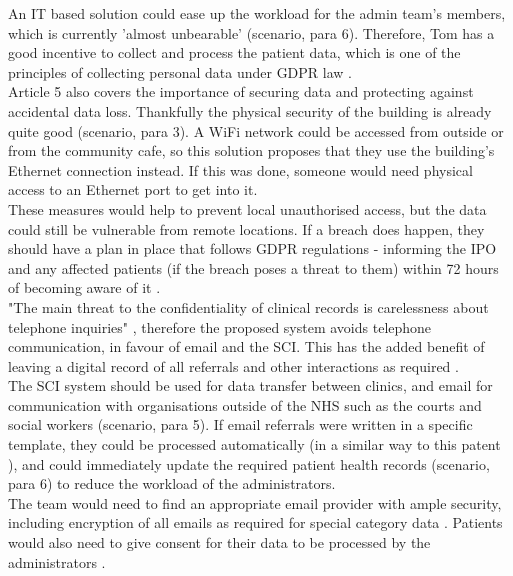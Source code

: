 \documentclass[12pt,a4paper]{article}
\begin{document}
An IT based solution could ease up the workload for the admin team's members, which is currently 'almost unbearable' (scenario, para 6). Therefore, Tom has a good incentive to collect and process the patient data, which is one of the principles of collecting personal data under GDPR law \cite{Article5}.\\ 

Article 5 also covers the importance of securing data and protecting against accidental data loss. Thankfully the physical security of the building is already quite good (scenario, para 3). A WiFi network could be accessed from outside or from the community cafe, so this solution proposes that they use the building's Ethernet connection instead. If this was done, someone would need physical access to an Ethernet port to get into it.\\

These measures would help to prevent local unauthorised access, but the data could still be vulnerable from remote locations. If a breach does happen, they should have a plan in place that follows GDPR regulations - informing the IPO and any affected patients (if the breach poses a threat to them) within 72 hours of becoming aware of it \cite{Article33&34}.\\

"The main threat to the confidentiality of clinical records is carelessness about telephone inquiries" \cite{ClinicalSystemSecurity}, therefore the proposed system avoids telephone communication, in favour of email and the SCI. This has the added benefit of leaving a digital record of all referrals and other interactions as required \cite{Article30}.\\

The SCI system should be used for data transfer between clinics, and email for communication with organisations outside of the NHS such as the courts and social workers (scenario, para 5). If email referrals were written in a specific template, they could be processed automatically (in a similar way to this patent \cite{AutoProcess}), and could immediately update the required patient health records (scenario, para 6) to reduce the workload of the administrators.\\

The team would need to find an appropriate email provider with ample security, including encryption of all emails as required for special category data \cite{Article32}. Patients would also need to give consent for their data to be processed by the administrators \cite{Article9}.\\
\end{document}
